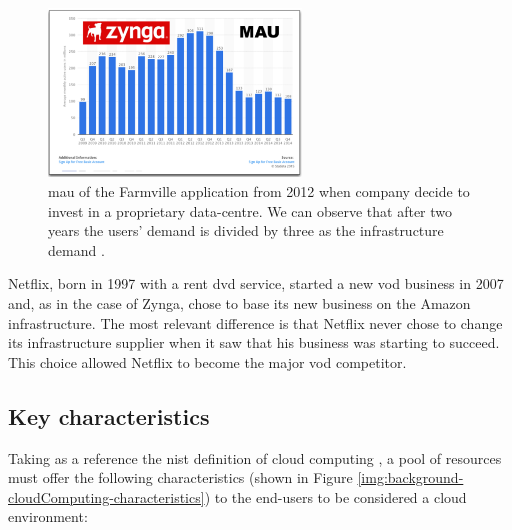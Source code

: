 \begin{figure}
	\centering{}
	\includegraphics[width=0.6\textwidth]{chapters/background/images/zynga-case.png}
	\caption[\acs{mau} of Farmville application after 2012]{\acf{mau} of the Farmville application from
		2012 when company decide to invest in a proprietary data-centre. We can observe that after two
		years the users' demand is divided by three as the infrastructure demand \cite{netflixZynga}.}
	\label{img:background-capexOpex-zyngaCase}
\end{figure}

Netflix, born in 1997 with a rent \acs{dvd} service, started a new \ac{vod} business in 2007 and, as
in the case of Zynga, chose to base its new business on the Amazon infrastructure. The most relevant
difference is that Netflix never chose to change its infrastructure supplier when it saw that his
business was starting to succeed. This choice allowed Netflix to become the major \ac{vod} competitor.

\subsection{Key characteristics}
\label{sec:background-cloudComputing-characteristics}
Taking as a reference the \ac{nist} definition of cloud computing \cite{nistCloudComputing}, a pool of resources
must offer the following characteristics (shown in Figure \ref{img:background-cloudComputing-characteristics})
to the end-users to be considered a cloud environment:

